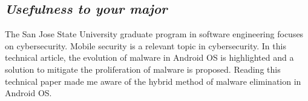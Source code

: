 \documentclass[letterpaper,10pt]{texMemo}
\begin{document}
\subsection*{\textit{Usefulness to your major}}
The San Jose State University graduate program in software engineering focuses on cybersecurity. Mobile security is a relevant topic in cybersecurity. In this technical article, the evolution of malware in Android OS is highlighted and a solution to mitigate the proliferation of malware is proposed. Reading this technical paper made me aware of the hybrid method of malware elimination in Android OS.


%


\end{document}
